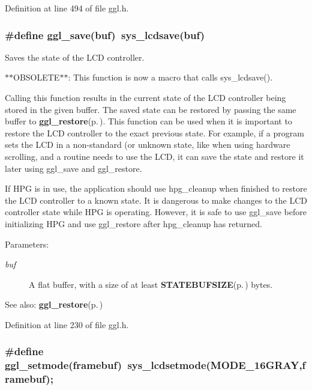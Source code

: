 Definition at line 494 of file ggl.h.
\subsubsection{\setlength{\rightskip}{0pt plus 5cm}\#define ggl\_\-save(buf)~sys\_\-lcdsave(buf)}\label{ggl_8h_a5}


Saves the state of the LCD controller. 

$\ast$$\ast$OBSOLETE$\ast$$\ast$: This function is now a macro that calls sys\_\-lcdsave().

Calling this function results in the current state of the LCD controller being stored in the given buffer. The saved state can be restored by passing the same buffer to {\bf ggl\_\-restore}{\rm (p.\,\pageref{ggl_8h_a11})}. This function can be used when it is important to restore the LCD controller to the exact previous state. For example, if a program sets the LCD in a non-standard (or unknown state, like when using hardware scrolling, and a routine needs to use the LCD, it can save the state and restore it later using ggl\_\-save and ggl\_\-restore.

If HPG is in use, the application should use hpg\_\-cleanup when finished to restore the LCD controller to a known state. It is dangerous to make changes to the LCD controller state while HPG is operating. However, it is safe to use ggl\_\-save before initializing HPG and use ggl\_\-restore after hpg\_\-cleanup has returned.

\begin{Desc}
\item[Parameters:]
\begin{description}
\item[{\em buf}]A flat buffer, with a size of at least {\bf STATEBUFSIZE}{\rm (p.\,\pageref{ggl_8h_a0})} bytes. \end{description}
\end{Desc}
\begin{Desc}
\item[See also:]{\bf ggl\_\-restore}{\rm (p.\,\pageref{ggl_8h_a11})} \end{Desc}


Definition at line 230 of file ggl.h.
\subsubsection{\setlength{\rightskip}{0pt plus 5cm}\#define ggl\_\-setmode(framebuf)~sys\_\-lcdsetmode(MODE\_\-16GRAY,framebuf);}\label{ggl_8h_a4}


